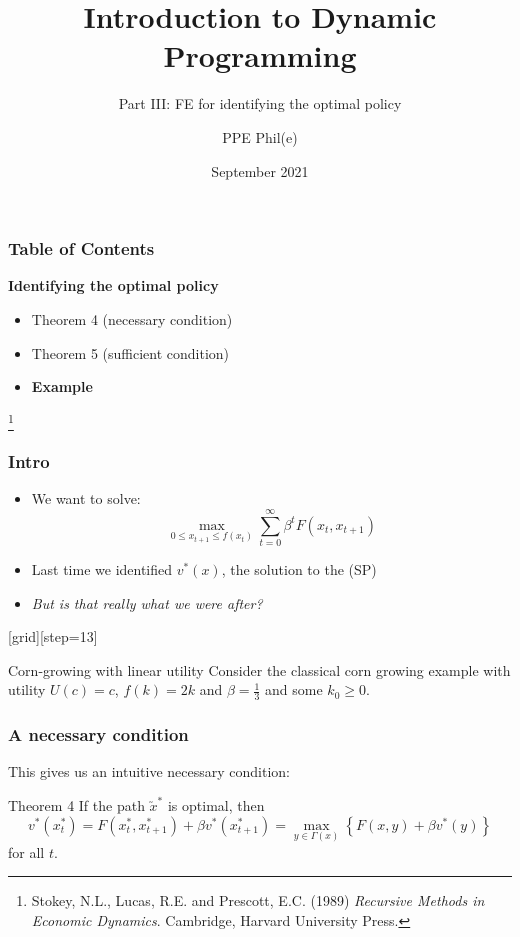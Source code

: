 \documentclass[aspectratio=169]{beamer}
\title[Dynamic Programming Part III] %
{Introduction to Dynamic Programming}
\subtitle{Part III: FE for identifying the optimal policy}
\author[PPE Phil(e)]
{PPE Phil(e)\inst{1}}
\institute[] %
{
  \inst{1}%
  material @ https://github.com/PPEphile
}
\date[2021] %
{September 2021}
\newcommand\blfootnote[1]{%
\begingroup
\renewcommand\thefootnote{}\footnote{#1}%
\addtocounter{footnote}{-1}%
\endgroup
}
\begin{document}
\frame{\titlepage}

\begin{frame}
\frametitle{Table of Contents}
\textbf{Identifying the \color{teal} optimal policy} \color{black} 
\begin{itemize}
\item Theorem 4 (necessary condition)
\item Theorem 5 (sufficient condition)
\item \textbf{Example}
\end{itemize}

\blfootnote{Stokey, N.L., Lucas, R.E. and Prescott, E.C. (1989) \textit{Recursive Methods in Economic Dynamics}. Cambridge, Harvard University Press.}

\end{frame}
%
\begin{frame}
\frametitle{Intro}
\begin{itemize}
\item We want to solve: 
\begin{equation}
\max_{0 \leq x_{t+1} \leq f(x_t)} \sum^{\infty}_{t=0} \beta^t F(x_t, x_{t+1}) \tag{SP}
\end{equation}
\item Last time we identified $v^*(x)$, the solution to the (SP)
\item \color{red}\textit{But is that really what we were after?} \color{black}
\end{itemize}

\end{frame}

{
[grid][step=13]
\begin{frame}[t]
\begin{block}{Corn-growing with linear utility}
Consider the classical corn growing example with utility $U(c)=c$, $f(k)=2 k$ and $\beta= \frac{1}{3}$ and some $k_0 \geq 0$.
\end{block}
\end{frame}

}



\begin{frame}
\frametitle{A necessary condition}
This gives us an intuitive necessary condition:
\begin{block}{Theorem 4}
If the path $\utilde{x}^{*}$ is optimal, then
\begin{equation*}
v^{*}(x_{t}^{*}) = F(x_{t}^{*}, x_{t+1}^{*}) + \beta v^{*}(x_{t+1}^{*}) = \max_{y \in \Gamma(x)} \left\lbrace F(x, y) + \beta v^{*}(y) \right\rbrace
\end{equation*}
for all $t$.
\end{block}
\end{frame}
\end{document}
